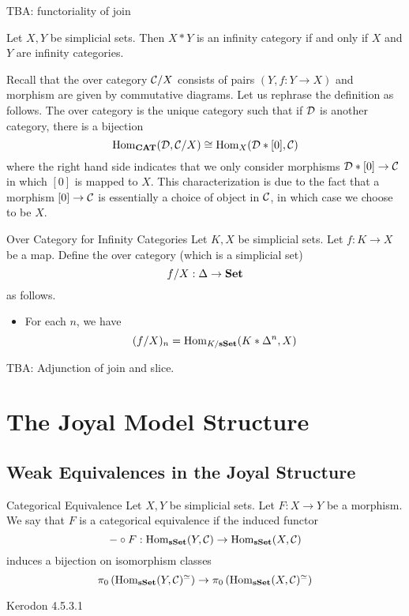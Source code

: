 \documentclass[a4paper]{article}
\begin{document}
TBA: functoriality of join

\begin{prp}{}{} Let $X,Y$ be simplicial sets. Then $X\ast Y$ is an infinity category if and only if $X$ and $Y$ are infinity categories. 
\end{prp}

Recall that the over category $\mathcal{C}/X$ consists of pairs $(Y,f:Y\to X)$ and morphism are given by commutative diagrams. Let us rephrase the definition as follows. The over category is the unique category such that if $\mathcal{D}$ is another category, there is a bijection $$\operatorname{Hom}_\bold{CAT}(\mathcal{D},\mathcal{C}/X)\cong\operatorname{Hom}_X(\mathcal{D}\ast[0],\mathcal{C})$$ where the right hand side indicates that we only consider morphisms $\mathcal{D}\ast[0]\to\mathcal{C}$ in which $[0]$ is mapped to $X$. This characterization is due to the fact that a morphism $[0]\to\mathcal{C}$ is essentially a choice of object in $\mathcal{C}$, in which case we choose to be $X$. 

\begin{defn}{Over Category for Infinity Categories}{} Let $K,X$ be simplicial sets. Let $f:K\to X$ be a map. Define the over category (which is a simplicial set) $$f/X:\Delta\to\bold{Set}$$ as follows. 
\begin{itemize}
\item For each $n$, we have $$(f/X)_n=\operatorname{Hom}_{K/\bold{sSet}}(K\ast\Delta^n,X)$$
\end{itemize}
\end{defn}

TBA: Adjunction of join and slice. 

\pagebreak
\section{The Joyal Model Structure}
\subsection{Weak Equivalences in the Joyal Structure}
\begin{defn}{Categorical Equivalence}{} Let $X,Y$ be simplicial sets. Let $F:X\to Y$ be a morphism. We say that $F$ is a categorical equivalence if the induced functor $$-\circ F:\operatorname{Hom}_\bold{sSet}(Y,\mathcal{C})\to\operatorname{Hom}_\bold{sSet}(X,\mathcal{C})$$ induces a bijection on isomorphism classes $$\pi_0\left(\operatorname{Hom}_\bold{sSet}(Y,\mathcal{C})^\simeq\right)\to\pi_0\left(\operatorname{Hom}_\bold{sSet}(X,\mathcal{C})^\simeq\right)$$
\end{defn}

Kerodon 4.5.3.1\\
\end{document}
